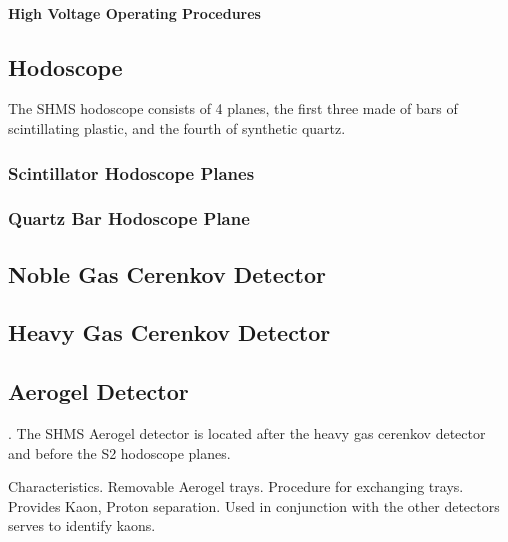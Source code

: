 \paragraph{High Voltage Operating Procedures}

\subsection{Hodoscope}
The SHMS hodoscope consists of 4 planes, the first three made of bars
of scintillating plastic, and the fourth of synthetic quartz.

\subsubsection{Scintillator Hodoscope Planes}

\subsubsection{Quartz Bar Hodoscope Plane}

\subsection{Noble Gas Cerenkov Detector}

\subsection{Heavy Gas Cerenkov Detector}

\subsection{Aerogel Detector}
.
The SHMS Aerogel detector is located after the heavy gas cerenkov
detector and before the S2 hodoscope planes.

Characteristics.  Removable Aerogel trays.  Procedure for exchanging
trays.  Provides Kaon, Proton separation. Used in conjunction with the
other detectors serves to identify kaons.

